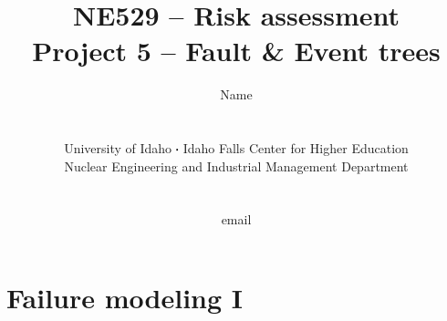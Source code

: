 \documentclass[11pt,a4paper]{article}
\newcommand*\sq{\mathbin{\vcenter{\hbox{\rule{.3ex}{.3ex}}}}} %
\begin{document}
\begin{titlepage}
    \title{
        NE529 -- Risk assessment\\
        Project 5 -- Fault \& Event trees\\
    }
    \author{
        Name
        \\ \\ \\
        University of Idaho $\sq$ Idaho Falls Center for Higher Education\\
        Nuclear Engineering and Industrial Management Department
        \\ \\ \\
        email 
    }
\clearpage %
\maketitle
\vspace*{\fill}
\thispagestyle{empty} %
\end{titlepage}


\printnoidxglossary


\newpage


\section{Failure modeling I}
\end{document}
